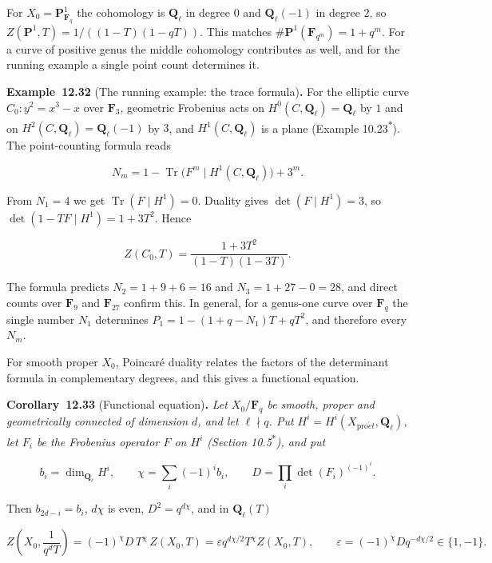 \documentclass[11pt]{article}
\newenvironment{bpstatement}[2]{\par\addvspace{0.6\baselineskip}\noindent\textbf{#1}#2\textbf{.}\enspace\ignorespaces}
  {\par\addvspace{0.4\baselineskip}}
\newenvironment{bpstatementit}[2]{\begin{bpstatement}{#1}{#2}\itshape\ignorespaces}{\end{bpstatement}}
\newcommand{\bpout}[1]{#1\textsuperscript{\hyperlink{bp-outside}{\ensuremath{\ast}}}}
\begin{document}
For \(X_0=\mathbf P^1_{\mathbf F_q}\) the cohomology is \(\mathbf Q_\ell\) in degree \(0\) and \(\mathbf Q_\ell(-1)\) in degree \(2\), so \(Z(\mathbf P^1,T)=1/((1-T)(1-qT))\). This matches \(\#\mathbf P^1(\mathbf F_{q^m})=1+q^m\). For a curve of positive genus the middle cohomology contributes as well, and for the running example a single point count determines it.

\label{bp98}%
\begin{bpstatement}{Example~12.32}{ (The running example: the trace formula)}
For the elliptic curve \(C_0\colon y^2=x^3-x\) over \(\mathbf F_3\), geometric Frobenius acts on \(H^0(C,\mathbf Q_\ell)=\mathbf Q_\ell\) by \(1\) and on \(H^2(C,\mathbf Q_\ell)=\mathbf Q_\ell(-1)\) by \(3\), and \(H^1(C,\mathbf Q_\ell)\) is a plane (Example \bpout{10.23}). The point-counting formula reads

\[
N_m=1-\operatorname{Tr}\bigl(F^m\mid H^1(C,\mathbf Q_\ell)\bigr)+3^m .
\]

From \(N_1=4\) we get \(\operatorname{Tr}(F\mid H^1)=0\). Duality gives \(\det(F\mid H^1)=3\), so \(\det(1-TF\mid H^1)=1+3T^2\). Hence

\[
Z(C_0,T)=\frac{1+3T^2}{(1-T)(1-3T)}.
\]

The formula predicts \(N_2=1+9+6=16\) and \(N_3=1+27-0=28\), and direct counts over \(\mathbf F_9\) and \(\mathbf F_{27}\) confirm this. In general, for a genus-one curve over \(\mathbf F_q\) the single number \(N_1\) determines \(P_1=1-(1+q-N_1)T+qT^2\), and therefore every \(N_m\).
\end{bpstatement}

\label{bp99}%
For smooth proper \(X_0\), Poincaré duality relates the factors of the determinant formula in complementary degrees, and this gives a functional equation.

\label{bp100}%
\begin{bpstatementit}{Corollary~12.33}{ (Functional equation)}
Let \(X_0/\mathbf F_q\) be smooth, proper and geometrically connected of dimension \(d\), and let \(\ell\nmid q\). Put \(H^i=H^i(X_{\mathrm{pro}\acute{e}t},\mathbf Q_\ell)\), let \(F_i\) be the Frobenius operator \(F\) on \(H^i\) (Section \bpout{10.5}), and put

\[
b_i=\dim_{\mathbf Q_\ell}H^i,\qquad \chi=\sum_i(-1)^ib_i,\qquad
D=\prod_i\det(F_i)^{(-1)^i}.
\]

Then \(b_{2d-i}=b_i\), \(d\chi\) is even, \(D^2=q^{d\chi}\), and in \(\mathbf Q_\ell(T)\)

\[
Z\!\left(X_0,\frac1{q^dT}\right)=(-1)^{\chi}D\,T^{\chi}\,Z(X_0,T)
=\varepsilon q^{d\chi/2}T^{\chi}Z(X_0,T),
\qquad \varepsilon=(-1)^\chi Dq^{-d\chi/2}\in\{1,-1\}.
\]
\end{bpstatementit}
\end{document}
